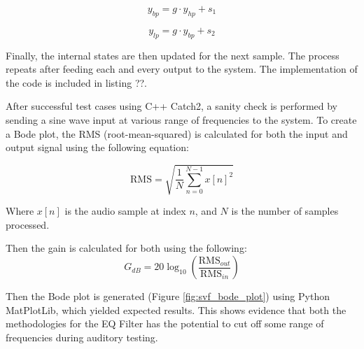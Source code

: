 \begin{equation}\label{eq:zdfsvf_bp}
    y_{bp} = g \cdot y_{hp} + s_1
\end{equation}

\begin{equation}\label{eq:zdfsvf_lp}
    y_{lp} = g \cdot y_{bp} + s_2
\end{equation}

Finally, the internal states are then updated for the next sample. The process repeats after feeding each and every output
to the system. The implementation of the code is included in listing ??.

After successful test cases using C++ Catch2, a sanity check is performed by sending a sine wave input at various range
of frequencies to the system. To create a Bode plot, the RMS (root-mean-squared) is calculated for both the input and output 
signal using the following equation:

\begin{equation}\label{eq:rms}
    \mathrm{RMS}=\sqrt{\frac{1}{N}\sum_{n=0}^{N-1}x[n]^2}
\end{equation}

Where $x[n]$ is the audio sample at index $n$, and $N$ is the number of samples processed.

Then the gain is calculated for both using the following:
\begin{equation}\label{eq:gain}
    G_{dB}=20\log_{10}\left(\frac{\mathrm{RMS}_{out}}{\mathrm{RMS}_{in}}\right)
\end{equation}

Then the Bode plot is generated (Figure \ref{fig:svf_bode_plot}) using Python MatPlotLib, which yielded expected results. This shows evidence that 
both the methodologies for the EQ Filter has the potential to cut off some range of frequencies during auditory testing.


